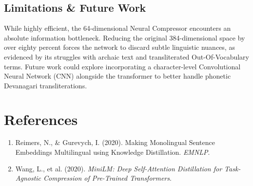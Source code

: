 \documentclass[11pt]{article}
\begin{document}
\subsection{Limitations \& Future Work}
While highly efficient, the 64-dimensional Neural Compressor encounters an absolute information bottleneck. Reducing the original 384-dimensional space by over eighty percent forces the network to discard subtle linguistic nuances, as evidenced by its struggles with archaic text and transliterated Out-Of-Vocabulary terms. Future work could explore incorporating a character-level Convolutional Neural Network (CNN) alongside the transformer to better handle phonetic Devanagari transliterations.

\section{References}
\begin{enumerate}
    \item Reimers, N., \& Gurevych, I. (2020). Making Monolingual Sentence Embeddings Multilingual using Knowledge Distillation. \textit{EMNLP}.
    \item Wang, L., et al. (2020). \textit{MiniLM: Deep Self-Attention Distillation for Task-Agnostic Compression of Pre-Trained Transformers}.
\end{enumerate}
\end{document}
